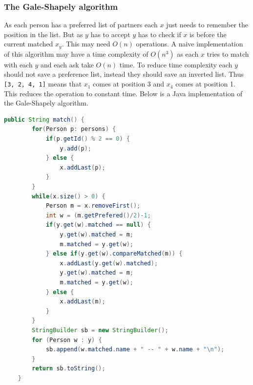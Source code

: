 \documentclass[12pt]{article} %
\begin{document}
\subsubsection{The Gale-Shapely algorithm}
As each person has a preferred list of partners each $x$ just needs to remember the position in the list. But as $y$ has to accept $y$ has to check if $x$ is before the current matched $x_{y}$. This may need $O(n)$ operations. A naive implementation of this algorithm may have a time complexity of $O(n^3)$ as each $x$ tries to match with each $y$ and each ask take $O(n)$ time. To reduce time complexity each $y$ should not save a preference list, instead they should save an inverted list. Thus \texttt{[3, 2, 4, 1]} means that $x_{1}$ comes at position 3 and $x_{4}$ comes at position 1. This reduces the operation to constant time. Below is a Java implementation of the Gale-Shapely algorithm.

\begin{lstlisting}[language=Java]
public String match() {
        for(Person p: persons) {
            if(p.getId() % 2 == 0) {
                y.add(p);
            } else {
                x.addLast(p);
            }
        }
        while(x.size() > 0) {
            Person m = x.removeFirst();
            int w = (m.getPrefered()/2)-1;
            if(y.get(w).matched == null) {
                y.get(w).matched = m;
                m.matched = y.get(w);
            } else if(y.get(w).compareMatched(m)) {
                x.addLast(y.get(w).matched);
                y.get(w).matched = m;
                m.matched = y.get(w);
            } else {
                x.addLast(m);
            }
        }
        StringBuilder sb = new StringBuilder();
        for (Person w : y) {
            sb.append(w.matched.name + " -- " + w.name + "\n");
        }
        return sb.toString();
    }
\end{lstlisting}
\end{document}
